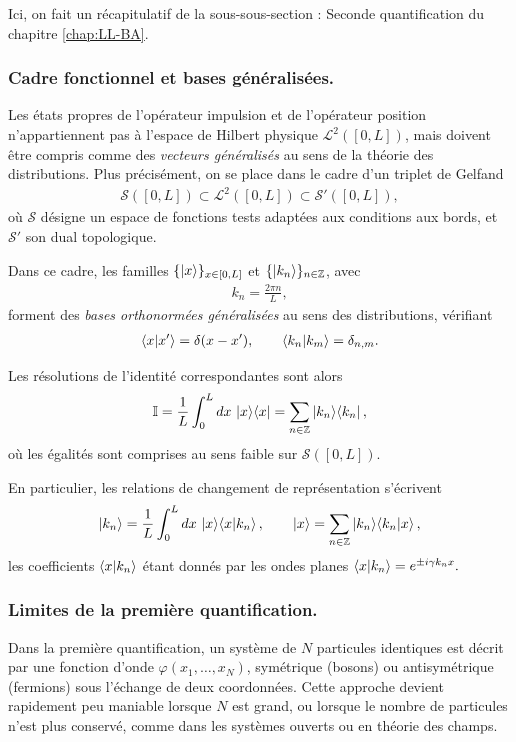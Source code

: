 Ici, on fait un récapitulatif de la sous-sous-section : \guillemotleft{}Seconde quantification\guillemotright{} du chapitre \ref{chap:LL-BA}.

\subsubsection{Cadre fonctionnel et bases généralisées.}
Les états propres de l’opérateur impulsion et de l’opérateur position n’appartiennent pas à l’espace de Hilbert physique $\mathcal L^2([0,L])$, mais doivent être compris comme des \emph{vecteurs généralisés} au sens de la théorie des distributions. Plus précisément, on se place dans le cadre d’un triplet de Gelfand
\begin{eqnarray}
    \mathcal{S}([0,L]) \subset \mathcal L^2([0,L]) \subset \mathcal{S}'([0,L]), 
\end{eqnarray}
où $\mathcal{S}$ désigne un espace de fonctions tests adaptées aux conditions aux bords, et $\mathcal{S}'$ son dual topologique.

Dans ce cadre, les familles $\{\ket{x}\}_{x\in[0,L]}$ et $\{\ket{k_n}\}_{n\in\mathbb{Z}}$, avec
\begin{eqnarray}
    k_n = \frac{2\pi n}{L},
\end{eqnarray}
forment des \emph{bases orthonormées généralisées}
au sens des distributions, vérifiant
\begin{eqnarray}
    \braket{x \vert x'} = \delta(x-x'),
\qquad
\braket{k_n \vert k_m} = \delta_{n,m}.
\end{eqnarray}

Les résolutions de l’identité correspondantes sont alors
\begin{eqnarray}
    \mathbb{I} = \frac{1}L \int_0^L dx\, \ket{x}\!\bra{x} = \sum_{n\in\mathbb{Z}} \ket{k_n}\!\bra{k_n},
\end{eqnarray}
où les égalités sont comprises au sens faible sur $\mathcal{S}([0,L])$.

En particulier, les relations de changement de représentation s’écrivent
\begin{eqnarray}
    \ket{k_n}
=
\frac{1}{L}
\int_0^L dx\,
\ket{x}\!\braket{x\vert k_n},
\qquad
\ket{x}
=
\sum_{n\in\mathbb{Z}}
\ket{k_n}\!\braket{k_n\vert x},
\end{eqnarray}
les coefficients $\braket{x\vert k_n}$ étant donnés par les ondes planes
\(
\braket{x\vert k_n} = e^{\pm i \gamma k_n x}.
\)


\subsubsection{Limites de la première quantification.}
Dans la première quantification, un système de $N$ particules identiques est décrit par une fonction d’onde $\varphi(x_1,\dots,x_N)$, symétrique (bosons) ou antisymétrique (fermions) sous l’échange de deux coordonnées.
Cette approche devient rapidement peu maniable lorsque $N$ est grand, ou lorsque le nombre de particules n’est plus conservé, comme dans les systèmes ouverts ou en théorie des champs.

